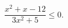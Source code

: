 \begin{ex}[type=inequality]
	\begin{condition}
		$ \dfrac{x^2 + x-12}{3x^2 + 5}\leqslant0 . $
	\end{condition}
\end{ex}